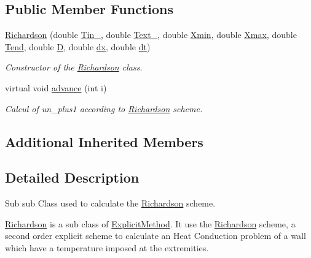 \subsection*{Public Member Functions}
\begin{DoxyCompactItemize}
\item 
\hyperlink{class_richardson_ae38842e27368e061f4f9ce3e692bcdbf}{Richardson} (double \hyperlink{class_heat_conduction_a2487010bf67582643ff59c0c5167725e}{Tin\+\_}, double \hyperlink{class_heat_conduction_aeb50fb3189fd6545f765ef73c9be7889}{Text\+\_}, double \hyperlink{class_heat_conduction_a6ccf374e13ab91b2403db617c9e7a8f0}{Xmin}, double \hyperlink{class_heat_conduction_a187dd05134300536dd9b5418e2957e9a}{Xmax}, double \hyperlink{class_heat_conduction_ab1d00caf79f4c04b420189eaf7c666e1}{Tend}, double \hyperlink{class_heat_conduction_a197d8aa3aa8619edaa640c243bdfc793}{D}, double \hyperlink{class_heat_conduction_a208bf1f475147b07a1f7d28533d78d9c}{dx}, double \hyperlink{class_heat_conduction_a7a7d5f6631039781c80b8c0c60e540e6}{dt})
\begin{DoxyCompactList}\small\item\em Constructor of the \hyperlink{class_richardson}{Richardson} class. \end{DoxyCompactList}\item 
virtual void \hyperlink{class_richardson_a9be0699e321b038d9361c209b3d542cb}{advance} (int i)
\begin{DoxyCompactList}\small\item\em Calcul of un\+\_\+plus1 according to \hyperlink{class_richardson}{Richardson} scheme. \end{DoxyCompactList}\end{DoxyCompactItemize}
\subsection*{Additional Inherited Members}


\subsection{Detailed Description}
Sub sub Class used to calculate the \hyperlink{class_richardson}{Richardson} scheme. 

\hyperlink{class_richardson}{Richardson} is a sub class of \hyperlink{class_explicit_method}{Explicit\+Method}. It use the \hyperlink{class_richardson}{Richardson} scheme, a second order explicit scheme to calculate an Heat Conduction problem of a wall which have a temperature imposed at the extremities. 

